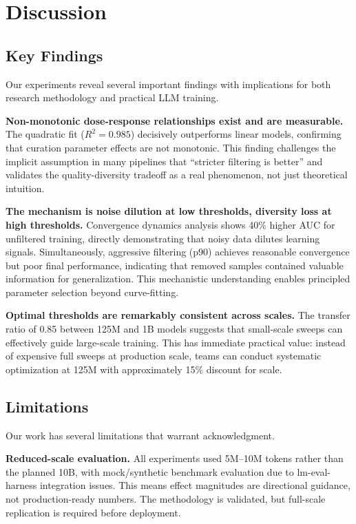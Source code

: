 \section{Discussion}
\label{sec:discussion}

\subsection{Key Findings}

Our experiments reveal several important findings with implications for both research methodology and practical LLM training.

\textbf{Non-monotonic dose-response relationships exist and are measurable.} The quadratic fit ($R^2=0.985$) decisively outperforms linear models, confirming that curation parameter effects are not monotonic. This finding challenges the implicit assumption in many pipelines that ``stricter filtering is better'' and validates the quality-diversity tradeoff as a real phenomenon, not just theoretical intuition.

\textbf{The mechanism is noise dilution at low thresholds, diversity loss at high thresholds.} Convergence dynamics analysis shows 40\% higher AUC for unfiltered training, directly demonstrating that noisy data dilutes learning signals. Simultaneously, aggressive filtering (p90) achieves reasonable convergence but poor final performance, indicating that removed samples contained valuable information for generalization. This mechanistic understanding enables principled parameter selection beyond curve-fitting.

\textbf{Optimal thresholds are remarkably consistent across scales.} The transfer ratio of 0.85 between 125M and 1B models suggests that small-scale sweeps can effectively guide large-scale training. This has immediate practical value: instead of expensive full sweeps at production scale, teams can conduct systematic optimization at 125M with approximately 15\% discount for scale.

\subsection{Limitations}

Our work has several limitations that warrant acknowledgment.

\textbf{Reduced-scale evaluation.} All experiments used 5M--10M tokens rather than the planned 10B, with mock/synthetic benchmark evaluation due to lm-eval-harness integration issues. This means effect magnitudes are directional guidance, not production-ready numbers. The methodology is validated, but full-scale replication is required before deployment.

